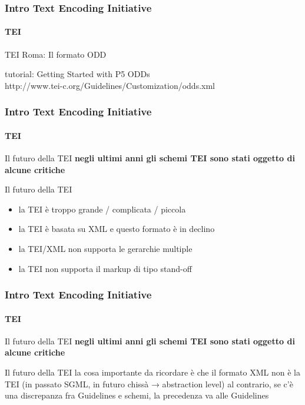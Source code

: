 \begin{frame}
	\frametitle{Intro Text Encoding Initiative}
	\framesubtitle{TEI}
	\addtocounter{nframe}{1}

	\begin{block}{TEI Roma: Il formato ODD}

		tutorial: Getting Started with P5 ODDs\\
		http://www.tei-c.org/Guidelines/Customization/odds.xml

	\end{block}


\end{frame}






\begin{frame}
	\frametitle{Intro Text Encoding Initiative}
	\framesubtitle{TEI}
	\addtocounter{nframe}{1}

	\begin{block}{Il futuro della TEI}
		\textbf{negli ultimi anni gli schemi TEI sono stati oggetto di alcune critiche}
	\end{block}

	\begin{block}{Il futuro della TEI}
		\begin{itemize}
			\item la TEI è troppo grande / complicata / piccola
			\item la TEI è basata su XML e questo formato è in declino
			\item la TEI/XML non supporta le gerarchie multiple
			\item la TEI non supporta il markup di tipo stand-off
		\end{itemize}
	\end{block}

\end{frame}


\begin{frame}
	\frametitle{Intro Text Encoding Initiative}
	\framesubtitle{TEI}
	\addtocounter{nframe}{1}

	\begin{block}{Il futuro della TEI}
		\textbf{negli ultimi anni gli schemi TEI sono stati oggetto di alcune critiche}
	\end{block}

	\begin{block}{Il futuro della TEI}
		la cosa importante da ricordare è che il formato XML non è
		la TEI (in passato SGML, in futuro chissà → abstraction level)
		al contrario, se c’è una discrepanza fra Guidelines e schemi,
		la precedenza va alle Guidelines
	\end{block}

\end{frame}


